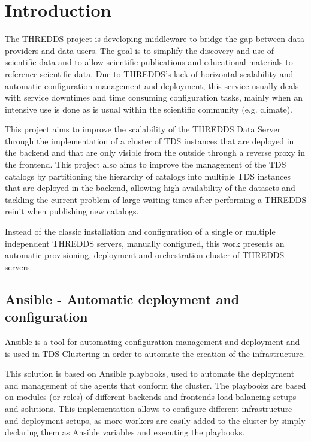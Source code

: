 \documentclass[a4paper,12pt]{article}
\begin{document}


\section{Introduction}

The THREDDS project is developing middleware to bridge the gap between data providers and data users. The goal is to simplify the discovery and use of scientific data and to allow scientific publications and educational materials to reference scientific data. Due to THREDDS's lack of horizontal scalability and automatic configuration management and deployment, this service usually deals with service downtimes and time consuming configuration tasks, mainly when an intensive use is done as is usual within the scientific community (e.g. climate).

This project aims to improve the scalability of the THREDDS Data Server through the implementation of a cluster of TDS instances that are deployed in the backend and that are only visible from the outside through a reverse proxy in the frontend. This project also aims to improve the management of the TDS catalogs by partitioning the hierarchy of catalogs into multiple TDS instances that are deployed in the backend, allowing high availability of the datasets and tackling the current problem of large waiting times after performing a THREDDS reinit when publishing new catalogs.  

Instead of the classic installation and configuration of a single or multiple independent THREDDS servers, manually configured, this work presents an automatic provisioning, deployment and orchestration cluster of THREDDS servers.

\subsection{Ansible - Automatic deployment and configuration}

Ansible is a tool for automating configuration management and deployment and is used in TDS Clustering in order to automate the creation of the infrastructure.

This solution is based on Ansible playbooks, used to automate the deployment and management of the agents that conform the cluster. The playbooks are based on modules (or roles) of different backends and frontends load balancing setups and solutions. This implementation allows to configure different infrastructure and deployment setups, as more workers are easily added to the cluster by simply declaring them as Ansible variables and executing the playbooks.
\end{document}
